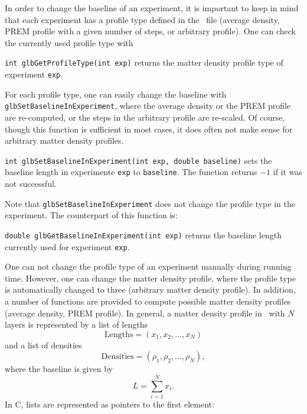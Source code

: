 In order to change the baseline of an experiment, it is important
to keep in mind that each experiment has a profile type defined
in the \AEDL\ file (average density, PREM profile with a given
number of steps, or arbitrary profile). One can check the currently
used profile type with
\begin{function}
{\tt int glbGetProfileType(int exp)} returns the matter density profile
type of experiment {\tt exp}.
\end{function}
For each profile type, one can easily change the baseline with {\tt glbSetBaselineInExperiment},
where the average density or the PREM profile are re-computed, or the
steps in the arbitrary profile are re-scaled. Of course, though this
function is sufficient in most cases, it does often not make sense
for arbitrary matter density profiles.
\begin{function}
{\tt int glbSetBaselineInExperiment(int exp, double baseline)}
sets the baseline length in experimente {\tt exp} to {\tt baseline}.
The function returns $-1$ if it was not successful.
\end{function}
Note that {\tt glbSetBaselineInExperiment} does not change the
profile type in the experiment. The counterpart of this function is:
\begin{function}
{\tt double glbGetBaselineInExperiment(int exp)} returns the
baseline length currently used for experiment {\tt exp}.
\end{function}
One can not change the profile type of an experiment manually
during running time. However, one can change the matter density
profile, where the profile type is automatically changed to three
(arbitrary matter density profile). In addition, a number of functions 
are provided to compute possible matter density profiles (average density,
PREM profile). In general, a matter density profile in \GLOBES\ with
$N$ layers is represented by a list of lengths 
\begin{equation}
\mathrm{Lengths} = (x_1,x_2, \hdots, x_N) 
\end{equation}
and a list of densities
\begin{equation}
\mathrm{Densities} = (\rho_1,\rho_2, \hdots, \rho_N), 
\end{equation}
where the baseline is given by
\begin{equation}
L = \sum\limits_{i=1}^N x_i.
\end{equation}
In C, lists are represented as pointers to the first element:
